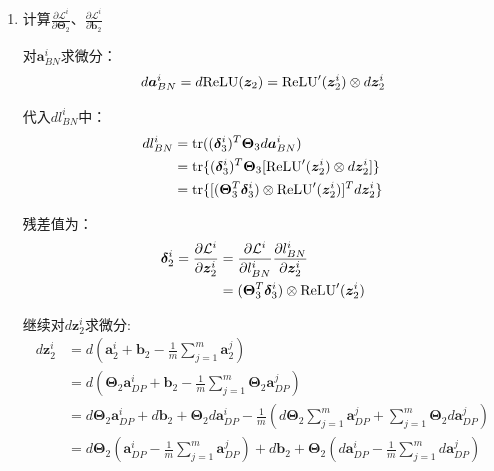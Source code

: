 \documentclass[12pt, a4paper]{article}
\newcommand{\imat}{\bm}
\newcommand{\ivec}{\bm}
\newcommand{\tr}{{\rm tr}}
\newcommand{\relu}{{\rm ReLU}}
\newcommand{\loss}{\mathcal{L}}
\newcommand{\thetam}{\imat{\Theta}}
\newcommand{\deltav}{\ivec{\delta}}
\newcommand{\av}{\ivec{a}}
\newcommand{\bv}{\ivec{b}}
\newcommand{\zv}{\ivec{z}}
\begin{document}
\begin{enumerate}
            得到梯度:
            \begin{align*}
            \frac{\partial \loss^i}{\partial \thetam_3} &= \deltav_3^i (\av_{BN}^i)^T \\
            \frac{\partial \loss^i}{\partial \bv_3} &= \deltav_3^i
            \end{align*}

            对$\loss^i$求和：
            \begin{align}
            \frac{\partial \loss}{\partial \thetam_3} &= \frac{1}{m} \sum_{i=1}^{m} \deltav_3^i (\av_{BN}^i)^T \\
            \frac{\partial \loss}{\partial \bv_3} &= \frac{1}{m} \sum_{i=1}^{m} \deltav_3^i
            \end{align}

        \item 计算$\frac{\partial \loss^i}{\partial \thetam_2}$、$\frac{\partial \loss^i}{\partial \bv_2}$

            对$\av_{BN}^i$求微分：
            \begin{align*}
            d \av_{BN}^i = d \relu(\zv_2) = \relu^{\prime}(\zv_2^i) \otimes d \zv_2^i
            \end{align*}

            代入$d l_{BN}^i$中：
            \begin{align*}
            d l_{BN}^i
            &= \tr((\deltav_3^i)^T \thetam_3 d \av_{BN}^i) \\
            &= \tr\{(\deltav_3^i)^T \thetam_3 [\relu^{\prime}(\zv_2^i) \otimes d \zv_2^i]\} \\
            &= \tr\{[(\thetam_3^T \deltav_3^i) \otimes \relu^{\prime}(\zv_2^i)]^T d \zv_2^i\}
            \end{align*}

            残差值为：
            \begin{equation}\begin{aligned}
            \deltav_2^i = \frac{\partial \loss^i}{\partial \zv_2^i}
            &= \frac{\partial \loss^i}{\partial l_{BN}^i} \frac{\partial l_{BN}^i}{\partial \zv_2^i} \\
            &= (\thetam_3^T \deltav_3^i) \otimes \relu^{\prime}(\zv_2^i)
            \end{aligned}\end{equation}

            继续对$d \zv_2^i$求微分:
            \begin{align*}
            d \zv_2^i
            &= d (\av_2^i + \bv_2 - \frac{1}{m} \sum_{j=1}^{m} \av_2^j) \\
            &= d (\thetam_2 \av_{DP}^i + \bv_2 - \frac{1}{m} \sum_{j=1}^{m} \thetam_2 \av_{DP}^j) \\
            &= d \thetam_2 \av_{DP}^i + d \bv_2 + \thetam_2 d \av_{DP}^i - \frac{1}{m} (d \thetam_2 \sum_{j=1}^{m} \av_{DP}^j + \sum_{j=1}^{m} \thetam_2 d \av_{DP}^j) \\
            &= d \thetam_2 (\av_{DP}^i - \frac{1}{m} \sum_{j=1}^{m} \av_{DP}^j) + d \bv_2 + \thetam_2 (d \av_{DP}^i - \frac{1}{m} \sum_{j=1}^{m} d \av_{DP}^j)
            \end{align*}


\end{enumerate}
\end{document}
